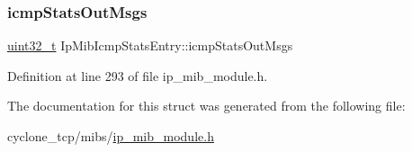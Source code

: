 \subsubsection{\texorpdfstring{icmp\+Stats\+Out\+Msgs}{icmpStatsOutMsgs}}
{\footnotesize\ttfamily \hyperlink{stdint_8h_a435d1572bf3f880d55459d9805097f62}{uint32\+\_\+t} Ip\+Mib\+Icmp\+Stats\+Entry\+::icmp\+Stats\+Out\+Msgs}



Definition at line 293 of file ip\+\_\+mib\+\_\+module.\+h.



The documentation for this struct was generated from the following file\+:\begin{DoxyCompactItemize}
\item 
cyclone\+\_\+tcp/mibs/\hyperlink{ip__mib__module_8h}{ip\+\_\+mib\+\_\+module.\+h}\end{DoxyCompactItemize}
